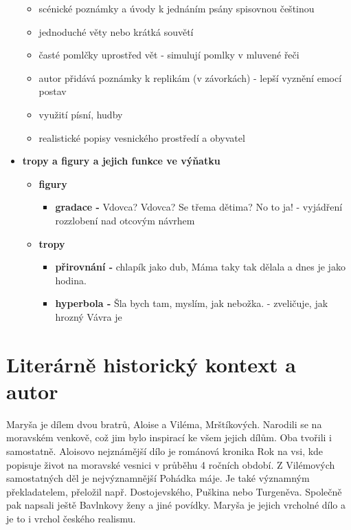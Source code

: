\documentclass[11pt]{article}
\begin{document}
\begin{itemize}
\begin{itemize}
            \item scénické poznámky a úvody k jednáním psány spisovnou češtinou
            \item jednoduché věty nebo krátká souvětí
            \item časté pomlčky uprostřed vět - simulují pomlky v mluvené řeči
            \item autor přidává poznámky k replikám (v závorkách) - lepší vyznění emocí postav
            \item využití písní, hudby
            \item realistické popisy vesnického prostředí a obyvatel
        \end{itemize}
        \item\textbf{tropy a figury a jejich funkce ve výňatku}
        \begin{itemize}
            \item\textbf{figury}
            \begin{itemize}
                \item\textbf{gradace -} Vdovca? Vdovca? Se třema dětima? No to ja! - vyjádření rozzlobení nad otcovým návrhem
            \end{itemize}
            \item\textbf{tropy}
            \begin{itemize}
                \item\textbf{přirovnání -} chlapík jako dub, Máma taky tak dělala a dnes je jako hodina.
                \item\textbf{hyperbola -} Šla bych tam, myslím, jak nebožka. - zveličuje, jak hrozný Vávra je
            \end{itemize}
        \end{itemize}
    \end{itemize}
    \section*{Literárně historický kontext a autor}
    Maryša je dílem dvou bratrů, Aloise a Viléma, Mrštíkových.
    Narodili se na moravském venkově, což jim bylo inspirací ke všem jejich dílům.
    Oba tvořili i samostatně. Aloisovo nejznámější dílo je románová kronika Rok na vsi, kde popisuje život na moravské vesnici v průběhu 4 ročních období.
    Z Vilémových samostatných děl je nejvýznamnější Pohádka máje.
    Je také významným překladatelem, přeložil např. Dostojevského, Puškina nebo Turgeněva.
    Společně pak napsali ještě Bavlnkovy ženy a jiné povídky.
    Maryša je jejich vrcholné dílo a je to i vrchol českého realismu.
\end{document}
